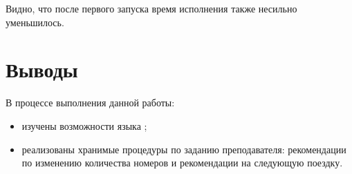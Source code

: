 Видно, что после первого запуска время исполнения также несильно уменьшилось. 

\section{Выводы}

В процессе выполнения данной работы:

\begin{itemize}
	\item изучены возможности языка ;
	\item реализованы хранимые процедуры по заданию преподавателя: рекомендации по изменению количества номеров и рекомендации на следующую поездку.
\end{itemize}




